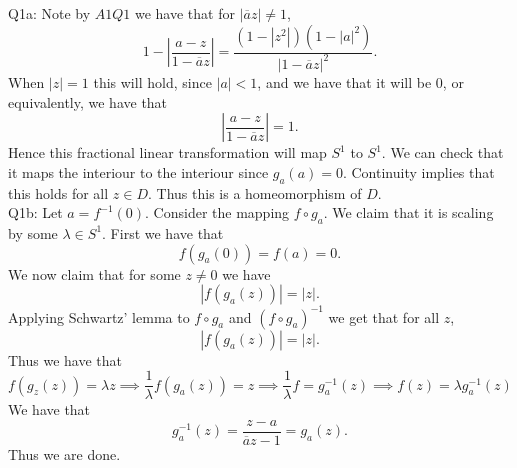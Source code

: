 \documentclass[letterpaper]{article}
\newcommand{\ol}{\overline}
\begin{document}
\noindent Q1a: Note by $A1Q1$ we have that for $|\ol{a}z |\neq 1$, $$1 - |\frac{a-z}{1- \ol{a}z}| = \frac{(1-|z^2|) (1-|a|^2)}{|1-\ol{a}z|^2}.$$
When $|z|=1$ this will hold, since $|a|<1$, and we have that it will be $0$, or equivalently, we have that $$|\frac{a-z}{1- \ol{a}z}|=1.$$ Hence this fractional linear transformation will map $S^1$ to $S^1$. We can check that it maps the interiour to the interiour since $g_a(a) =0$. Continuity implies that this holds for all $z\in D$. Thus this is a homeomorphism of $D$. 
\newline \\ Q1b: Let $a = f^{-1}(0). $ Consider the mapping $f\circ g_a$. We claim that it is scaling by some $\lambda\in S^1$. First we have that $$f(g_a(0))= f(a)=0.$$ 
We now claim that for some $z\neq 0$ we have $$|f(g_a(z))| = |z|.$$ Applying Schwartz' lemma to $f\circ g_a$ and $(f\circ g_a)^{-1}$ we get that for all $z$,$$|f(g_a(z))| = |z|. $$ Thus we have that $$f(g_z(z)) = \lambda z \implies \frac{1}{\lambda }f(g_a(z)) = z \implies \frac{1}{\lambda}f = g_a^{-1}(z) \implies f(z) = \lambda g^{-1}_a(z)$$
We have that $$g^{-1}_a(z) = \frac{z-a}{\ol{a}z-1} = g_{a}(z).$$ Thus we are done. 
\end{document}
